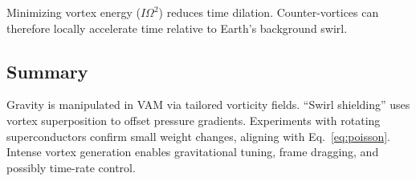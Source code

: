 Minimizing vortex energy ($I\Omega^2$) reduces time dilation. Counter-vortices can therefore locally accelerate time relative to Earth’s background swirl.

\subsection{Summary}
Gravity is manipulated in VAM via tailored vorticity fields. “Swirl shielding” uses vortex superposition to offset pressure gradients. Experiments with rotating superconductors confirm small weight changes, aligning with Eq.~\eqref{eq:poisson}. Intense vortex generation enables gravitational tuning, frame dragging, and possibly time-rate control.